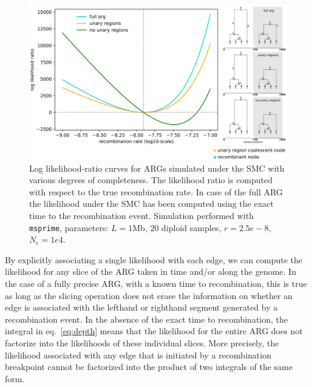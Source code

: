 \documentclass{article}
\begin{document}
\begin{figure}[!ht]
    \centering
    \includegraphics[width=\textwidth]{figures/likratio.png}
    \caption{Log likelihood-ratio curves for ARGs simulated under the SMC with
    various degrees of completeness. The likelihood ratio is computed with
    respect to the true recombination rate. In case of the full ARG the likelihood
    under the SMC has been computed using the exact time to the recombination event.
    Simulation performed with \texttt{msprime}, parameters: $L=1$Mb, $20$ diploid samples,
    $r=2.5e-8$, $N_e=1e4$.}
    \label{fig:lik-surface}
\end{figure}


By explicitly associating a single likelihood with each edge,
we can compute the likelihood for any slice of the ARG taken in
time and/or along the genome.
In the case of a fully precise ARG, with a known time to recombination,
this is true as long as the slicing operation does not erase the
information on whether an edge is associated with the lefthand or
righthand segment generated by a recombination event. In the absence
of the exact time to recombination, the integral in
eq.\ \ref{eq:depth} means that the likelihood
for the entire ARG does not factorize into the likelihoods of these
individual slices. More precisely, the likelihood associated with any
edge that is initiated by a recombination breakpoint cannot be factorized
into the product of two integrals of the same form.
\end{document}
